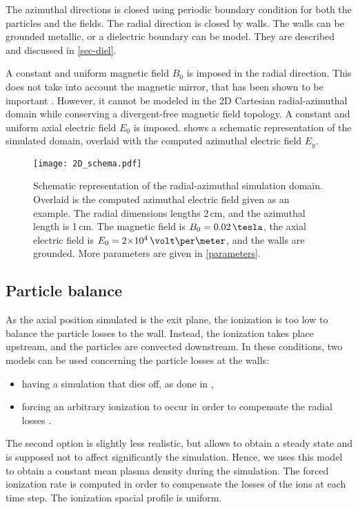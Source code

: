 The azimuthal directions is closed using periodic boundary condition for both the particles and the fields.
The radial direction is closed by walls.
The walls can be grounded metallic, or a dielectric boundary can be model.
They are described and discussed in \cref{sec-diel}.

A constant and uniform magnetic field $B_0$ is imposed in the radial direction.
This does not take into account the magnetic mirror, that has been shown to be important \citep{keidar2005,yu2008a,dominguez-vazquez2018}.
However, it cannot be modeled in the \ac{2D} Cartesian radial-azimuthal domain while conserving a divergent-free magnetic field topology.
A constant and uniform axial electric field $E_0$ is imposed.
 shows a schematic representation of the simulated domain, overlaid with the computed azimuthal electric field $E_y$.

\begin{figure}[hbtp]
  \centering
  \texttt{[image: 2D\_schema.pdf]}
  \caption{Schematic representation of the radial-azimuthal simulation domain. Overlaid is the computed azimuthal electric field given as an example. The radial dimensions lengths 2\,cm, and the azimuthal length is 1\,cm.
  The magnetic field is $B_0=0.02\,\tesla$, the axial electric field is $E_0=\sn{2}{4}\,\volt\per\meter$, and the walls are grounded. More parameters are given in \cref{parameters}.}
  \label{fig-2dschemat}
\end{figure}

\subsection{Particle balance}
As the axial position simulated is the exit plane, the ionization is too low to balance the particle losses to the wall.
Instead, the ionization takes place upstream, and the particles are convected downstream.
In these conditions, two models can be used concerning the particle losses at the walls\string:
\begin{itemize}
  \item having a simulation that dies off, as done in \citet{janhunen2018},
  \item forcing an arbitrary ionization to occur in order to compensate the radial losses \citep{dominguez-vazquez2018}.
\end{itemize}
The second option is slightly less realistic, but allows to obtain a steady state and is supposed not to affect significantly the simulation.
Hence, we uses this model to obtain a constant mean plasma density during the simulation.
The forced ionization rate is computed in order to compensate the losses of the ions at each time step.
The ionization spacial profile is uniform.


